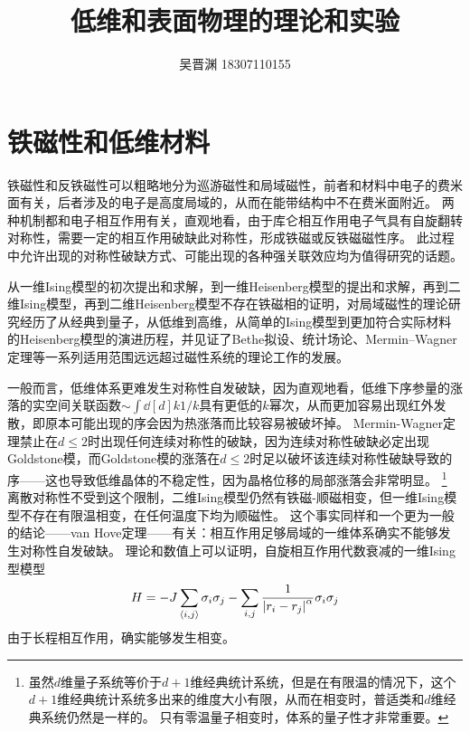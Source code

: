 \documentclass[hyperref, UTF8]{ctexart}
\title{低维和表面物理的理论和实验}
\author{吴晋渊 18307110155}
\newcommand*{\pair}[1]{\langle #1 \rangle}
\begin{document}
\maketitle

\section{铁磁性和低维材料}

铁磁性和反铁磁性可以粗略地分为巡游磁性和局域磁性，前者和材料中电子的费米面有关，后者涉及的电子是高度局域的，从而在能带结构中不在费米面附近。
两种机制都和电子相互作用有关\cite{annurev.ms.14.080184.000245,Cleveland_1976}，直观地看，由于库仑相互作用电子气具有自旋翻转对称性，需要一定的相互作用破缺此对称性，形成铁磁或反铁磁磁性序。
此过程中允许出现的对称性破缺方式、可能出现的各种强关联效应均为值得研究的话题。

从一维Ising模型的初次提出和求解\cite{ising1925beitrag}，到一维Heisenberg模型的提出和求解\cite{Bethe_1931}，再到二维Ising模型\cite{onsager1944crystal}，再到二维Heisenberg模型不存在铁磁相的证明\cite{PhysRevLett.17.1133}，对局域磁性的理论研究经历了从经典到量子，从低维到高维，从简单的Ising模型到更加符合实际材料的Heisenberg模型的演进历程，并见证了Bethe拟设、统计场论、Mermin–Wagner定理等一系列适用范围远远超过磁性系统的理论工作的发展。

一般而言，低维体系更难发生对称性自发破缺，因为直观地看，低维下序参量的涨落的实空间关联函数$\sim \int \dd[d]{k} 1/k$具有更低的$k$幂次，从而更加容易出现红外发散，即原本可能出现的序会因为热涨落而比较容易被破坏掉。
Mermin-Wagner定理禁止在$d \leq 2$时出现任何连续对称性的破缺，因为连续对称性破缺必定出现Goldstone模，而Goldstone模的涨落在$d \leq 2$时足以破坏该连续对称性破缺导致的序——这也导致低维晶体的不稳定性，因为晶格位移的局部涨落会非常明显\cite{landau-symmetry}。%
\footnote{
    虽然$d$维量子系统等价于$d+1$维经典统计系统，但是在有限温的情况下，这个$d+1$维经典统计系统多出来的维度大小有限，从而在相变时，普适类和$d$维经典系统仍然是一样的。
    只有零温量子相变时，体系的量子性才非常重要。
}%
离散对称性不受到这个限制，二维Ising模型仍然有铁磁-顺磁相变，但一维Ising模型不存在有限温相变，在任何温度下均为顺磁性。
这个事实同样和一个更为一般的结论——van Hove定理——有关：相互作用足够局域的一维体系确实不能够发生对称性自发破缺\cite{Cuesta_2004}。
理论和数值上可以证明，自旋相互作用代数衰减的一维Ising型模型
\begin{equation}
    H = - J \sum_{\pair{i, j}} \sigma_i \sigma_j - \sum_{i, j} \frac{1}{\abs{r_i - r_j}^\alpha} \sigma_i \sigma_j
\end{equation}
由于长程相互作用，确实能够发生相变\cite{PhysRevB.54.R12661}。
\end{document}
